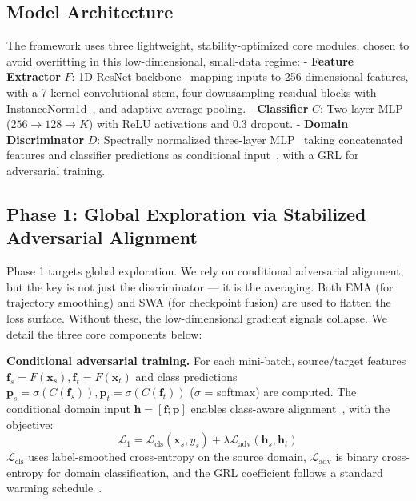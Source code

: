 \documentclass[conference]{IEEEtran}
\begin{document}
\subsection{Model Architecture}
\label{sec:architecture}
The framework uses three lightweight, stability-optimized core modules, chosen to avoid overfitting in this low-dimensional, small-data regime:
- \textbf{Feature Extractor} $F$: 1D ResNet backbone~\cite{he2016deep} mapping inputs to 256-dimensional features, with a 7-kernel convolutional stem, four downsampling residual blocks with InstanceNorm1d~\cite{ulyanov2016instance}, and adaptive average pooling.
- \textbf{Classifier} $C$: Two-layer MLP ($256 \to 128 \to K$) with ReLU activations and 0.3 dropout.
- \textbf{Domain Discriminator} $D$: Spectrally normalized three-layer MLP~\cite{miyato2018spectral} taking concatenated features and classifier predictions as conditional input~\cite{long2018conditional}, with a GRL for adversarial training.

\subsection{Phase 1: Global Exploration via Stabilized Adversarial Alignment}
\label{sec:phase1}

Phase 1 targets global exploration. We rely on conditional adversarial alignment, but the key is not just the discriminator — it is the averaging. Both EMA (for trajectory smoothing) and SWA (for checkpoint fusion) are used to flatten the loss surface. Without these, the low-dimensional gradient signals collapse. We detail the three core components below:

\textbf{Conditional adversarial training.} For each mini-batch, source/target features $\mathbf{f}_s=F(\mathbf{x}_s), \mathbf{f}_t=F(\mathbf{x}_t)$ and class predictions $\mathbf{p}_s=\sigma(C(\mathbf{f}_s)), \mathbf{p}_t=\sigma(C(\mathbf{f}_t))$ ($\sigma$ = softmax) are computed. The conditional domain input $\mathbf{h}=[\mathbf{f};\mathbf{p}]$ enables class-aware alignment~\cite{long2018conditional}, with the objective:
\begin{equation}
    \mathcal{L}_1 = \mathcal{L}_{\text{cls}}(\mathbf{x}_s, y_s) + \lambda \mathcal{L}_{\text{adv}}(\mathbf{h}_s, \mathbf{h}_t)
\label{eq:phase1}
\end{equation}
$\mathcal{L}_{\text{cls}}$ uses label-smoothed cross-entropy on the source domain, $\mathcal{L}_{\text{adv}}$ is binary cross-entropy for domain classification, and the GRL coefficient follows a standard warming schedule~\cite{ganin2016domain}.
\end{document}
